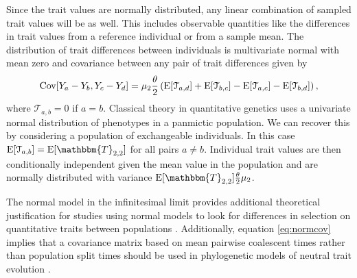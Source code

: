 Since the trait values are normally distributed, any linear combination of
sampled trait values will be as well. This includes observable quantities like
the differences in trait values from a reference individual or from a sample
mean. The distribution of trait differences between individuals is multivariate
normal with mean zero and covariance between any pair of trait differences given
by
\begin{equation}
  \label{eq:normcov}
  \mathrm{Cov}[Y_a-Y_b,Y_c-Y_d] = \mu_  2\frac{\theta}{2}\left( \mathrm{E}[\mathcal{T}_{a,d}] + \mathrm{E}[\mathcal{T}_{b,c}] -
                         \mathrm{E}[\mathcal{T}_{a,c}] - \mathrm{E}[\mathcal{T}_{b,d}] \right),
\end{equation}
where $\mathcal{T}_{a,b} = 0$ if $a=b$. Classical theory in quantitative
genetics uses a univariate normal distribution of phenotypes in a panmictic
population. We can recover this by considering a population of exchangeable
individuals. In this case $\E[\mathcal{T}_{a,b}] = \E[\mathbbm{T}_{2,2}]$ for
all pairs $a \neq b$. Individual trait values are then conditionally independent
given the mean value in the population and are normally distributed with
variance $\E[\mathbbm{T}_{2,2}]\T\mu_2$.

The normal model in the infinitesimal limit provides additional theoretical
justification for studies using normal models to look for differences in
selection on quantitative traits between populations
\citep{Ovaskainen2011,Praebel2013,Robinson2015}. Additionally, equation
\eqref{eq:normcov} implies that a covariance matrix based on mean pairwise
coalescent times rather than population split times should be used in
phylogenetic models of neutral trait evolution \citep{Mendes2018}.

 
